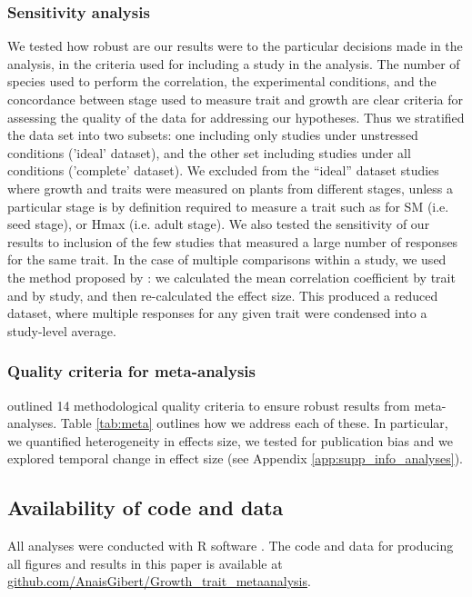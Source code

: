 \documentclass[a4paper,11pt]{article}
\newcommand{\smurl}[1]{\url{#1}}
\begin{document}
\subsubsection*{Sensitivity analysis}\label{sensitivity-analysis}

We tested how robust are our results were to the particular decisions made in the analysis, in the criteria used for including a study in the analysis. The number of species used to perform the correlation, the experimental conditions, and the concordance between stage used to measure trait and growth are clear criteria for assessing the quality of the data for addressing our hypotheses. Thus we stratified the data set into two subsets: one including only studies under unstressed conditions ('ideal' dataset), and the other set including studies under all conditions ('complete' dataset). We excluded from the ``ideal'' dataset studies where growth and traits were measured on plants from different stages, unless a particular stage is by definition required to measure a trait such as for SM (i.e. seed stage), or Hmax (i.e. adult stage).
We also tested the sensitivity of our results to inclusion of the few studies that measured a large number of responses for the same trait. In the case of multiple comparisons within a study, we used the method proposed by \citet{Borenstein:2009um}: we calculated the mean correlation coefficient by trait and by study, and then re-calculated the effect size. This produced a reduced dataset, where multiple responses for any given trait were condensed into a study-level average.

\subsubsection*{Quality criteria for meta-analysis}

\cite{Koricheva:2014ku} outlined 14 methodological quality criteria to ensure robust results from meta-analyses. Table \ref{tab:meta} outlines how we address each of these.  In particular, we quantified heterogeneity in effects size, we tested for publication bias and we explored temporal change in effect size (see Appendix \ref{app:supp_info_analyses}).

\subsection*{Availability of code and data}\label{code}

All analyses were conducted with R software \citep{Ralanguageanden:2014wf}. The code and data for producing all figures and results in this paper is available at \smurl{github.com/AnaisGibert/Growth\_trait\_metaanalysis}.
\end{document}
